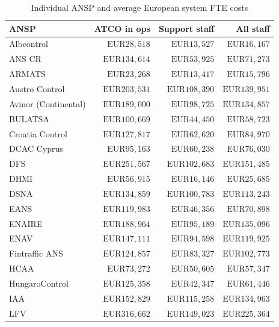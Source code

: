 \documentclass[
  11pt,
  a4paper,
]{book}
\begin{document}
\hypertarget{tbl-ansp-empl-cost}{}
\setlength{\LTpost}{0mm}
\begin{longtable}{lrrr}
\caption{\label{tbl-ansp-empl-cost}Individual ANSP and average European system FTE costs }\tabularnewline

\toprule
ANSP & ATCO in ops & Support staff & All staff \\ 
\midrule
Albcontrol & $\text{EUR}28,518$ & $\text{EUR}13,527$ & $\text{EUR}16,167$ \\ 
ANS CR & $\text{EUR}134,614$ & $\text{EUR}53,925$ & $\text{EUR}71,273$ \\ 
ARMATS & $\text{EUR}23,268$ & $\text{EUR}13,417$ & $\text{EUR}15,796$ \\ 
Austro Control & $\text{EUR}203,531$ & $\text{EUR}108,390$ & $\text{EUR}139,951$ \\ 
Avinor (Continental) & $\text{EUR}189,000$ & $\text{EUR}98,725$ & $\text{EUR}134,857$ \\ 
BULATSA & $\text{EUR}100,669$ & $\text{EUR}44,450$ & $\text{EUR}58,723$ \\ 
Croatia Control & $\text{EUR}127,817$ & $\text{EUR}62,620$ & $\text{EUR}84,970$ \\ 
DCAC Cyprus & $\text{EUR}95,163$ & $\text{EUR}60,238$ & $\text{EUR}76,030$ \\ 
DFS & $\text{EUR}251,567$ & $\text{EUR}102,683$ & $\text{EUR}151,485$ \\ 
DHMI & $\text{EUR}56,915$ & $\text{EUR}16,146$ & $\text{EUR}25,685$ \\ 
DSNA & $\text{EUR}134,859$ & $\text{EUR}100,783$ & $\text{EUR}113,243$ \\ 
EANS & $\text{EUR}119,983$ & $\text{EUR}46,356$ & $\text{EUR}70,898$ \\ 
ENAIRE & $\text{EUR}188,964$ & $\text{EUR}95,189$ & $\text{EUR}135,096$ \\ 
ENAV & $\text{EUR}147,111$ & $\text{EUR}94,598$ & $\text{EUR}119,925$ \\ 
Fintraffic ANS & $\text{EUR}124,857$ & $\text{EUR}83,327$ & $\text{EUR}102,773$ \\ 
HCAA & $\text{EUR}73,272$ & $\text{EUR}50,605$ & $\text{EUR}57,347$ \\ 
HungaroControl & $\text{EUR}125,358$ & $\text{EUR}42,347$ & $\text{EUR}61,446$ \\ 
IAA & $\text{EUR}152,829$ & $\text{EUR}115,258$ & $\text{EUR}134,963$ \\ 
LFV & $\text{EUR}316,662$ & $\text{EUR}149,023$ & $\text{EUR}225,364$ \\ 

\end{longtable}
\end{document}
